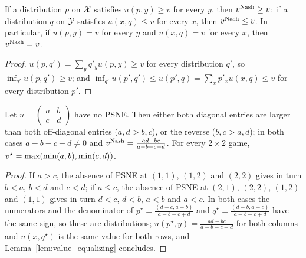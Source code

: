 \begin{lemma}
  \label{lem:value_equalizing}
  \leanok
  If a distribution $p$ on $\mathcal{X}$ satisfies $u(p, y) \ge v$ for every $y$, then $v^{\mathrm{Nash}} \ge v$; if a
  distribution $q$ on $\mathcal{Y}$ satisfies $u(x, q) \le v$ for every $x$, then $v^{\mathrm{Nash}} \le v$. In
  particular, if $u(p, y) = v$ for every $y$ and $u(x, q) = v$ for every $x$, then $v^{\mathrm{Nash}} = v$.
\end{lemma}

\begin{proof}
  \leanok
  $u(p, q') = \sum_y q'_y u(p, y) \ge v$ for every distribution $q'$, so $\inf_{q'} u(p, q') \ge v$;
  and $\inf_{q'} u(p', q') \le u(p', q) = \sum_x p'_x u(x, q) \le v$ for every distribution $p'$.
\end{proof}

\begin{lemma}
  \label{lem:two_by_two_value}
  \leanok
  Let $u = \begin{pmatrix} a & b \\ c & d \end{pmatrix}$ have no PSNE. Then either both diagonal
  entries are larger than both off-diagonal entries ($a, d > b, c$), or the reverse
  ($b, c > a, d$); in both cases $a - b - c + d \ne 0$ and
  $v^{\mathrm{Nash}} = \frac{ad - bc}{a - b - c + d}$. For every $2 \times 2$ game,
  $v^\star = \max(\min(a, b), \min(c, d))$.
\end{lemma}

\begin{proof}
  \leanok
  If $a > c$, the absence of PSNE at $(1, 1)$, $(1, 2)$ and $(2, 2)$ gives in turn $b < a$,
  $b < d$ and $c < d$; if $a \le c$, the absence of PSNE at $(2, 1)$, $(2, 2)$, $(1, 2)$ and
  $(1, 1)$ gives in turn $d < c$, $d < b$, $a < b$ and $a < c$. In both cases the numerators and
  the denominator of $p^\star = \frac{(d - c, a - b)}{a - b - c + d}$ and
  $q^\star = \frac{(d - b, a - c)}{a - b - c + d}$ have the same sign, so these are distributions;
  $u(p^\star, y) = \frac{ad - bc}{a - b - c + d}$ for both columns and $u(x, q^\star)$ is the same
  value for both rows, and Lemma~\ref{lem:value_equalizing} concludes.
\end{proof}

